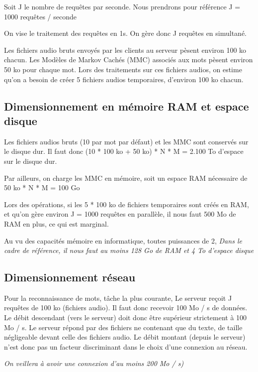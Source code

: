 \documentclass[a4paper,12pt]{report}
\begin{document}
\medskip{}

Soit J le nombre de requêtes par seconde.
Nous prendrons pour référence J = 1000 requêtes / seconde

\smallskip{}

On vise le traitement des requêtes en 1s.
On gère donc J requêtes en simultané.

\medskip{}

Les fichiers audio bruts envoyés par les clients au serveur pèsent environ 100 ko chacun.
Les Modèles de Markov Cachés (MMC) associés aux mots pèsent environ 50 ko pour chaque mot.
Lors des traitements sur ces fichiers audios, on estime qu'on a besoin de créer 5 fichiers audios temporaires, d'environ 100 ko chacun.

\subsection{Dimensionnement en mémoire RAM et espace disque}

Les fichiers audios bruts (10 par mot par défaut) et les MMC sont conservés sur le disque dur.
Il faut donc (10 * 100 ko + 50 ko) * N * M = 2.100 To d'espace sur le disque dur.

Par ailleurs, on charge les MMC en mémoire, soit un espace RAM nécessaire de 50 ko * N * M = 100 Go

Lors des opérations, si les 5 * 100 ko de fichiers temporaires sont créés en RAM, et qu'on gère environ J = 1000 requêtes en parallèle, il nous faut 500 Mo de RAM en plus, ce qui est marginal.

Au vu des capacités mémoire en informatique, toutes puissances de 2,
\emph{Dans le cadre de référence, il nous faut au moins 128 Go de RAM et 4 To d'espace disque}

\subsection{Dimensionnement réseau}

Pour la reconnaissance de mots, tâche la plus courante,
Le serveur reçoit J requêtes de 100 ko (fichiers audio). Il faut donc recevoir 100 Mo / s de données. Le débit descendant (vers le serveur) doit donc être supérieur strictement à 100 Mo / s.
Le serveur répond par des fichiers ne contenant que du texte, de taille négligeable devant celle des fichiers audio. Le débit montant (depuis le serveur) n'est donc pas un facteur discriminant dans le choix d'une connexion au réseau.

\emph{On veillera à avoir une connexion d'au moins 200 Mo / s)} 
\end{document}
